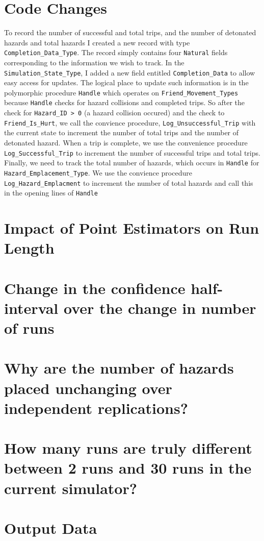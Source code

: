 \documentclass[12pt,letterpaper,titlepage]{article}
\newcommand{\code}[1]{\texttt{#1}}
\begin{document}

\doublespacing

\section{Code Changes}

To record the number of successful and total trips, and the number of
detonated hazards and total hazards I created a new record with type
\code{Completion_Data_Type}.  The record simply contains four
\code{Natural} fields corresponding to the information we wish to
track.  In the \code{Simulation_State_Type}, I added a new field
entitled \code{Completion_Data} to allow easy access for updates.  The
logical place to update such information is in the polymorphic
procedure \code{Handle} which operates on \code{Friend_Movement_Types}
because \code{Handle} checks for hazard collisions and completed
trips.  So after the check for \code{Hazard_ID > 0} (a hazard
collision occured) and the check to \code{Friend_Is_Hurt}, we call the
convience procedure, \code{Log_Unsuccessful_Trip} with the current
state to increment the number of total trips and the number of
detonated hazard.  When a trip is complete, we use the convenience
procedure \code{Log_Successful_Trip} to increment the number of
successful trips and total trips.  Finally, we need to track the total
number of hazards, which occurs in \code{Handle} for
\code{Hazard_Emplacement_Type}.  We use the convience procedure
\code{Log_Hazard_Emplacment} to increment the number of total hazards
and call this in the opening lines of \code{Handle}

\section{Impact of Point Estimators on Run Length}
\section{Change in the confidence half-interval over the change in number of runs}

\section{Why are the number of hazards placed unchanging over independent replications?}

\section{How many runs are truly different between 2 runs and 30 runs in the current simulator?}

\section{Output Data}
\end{document}
